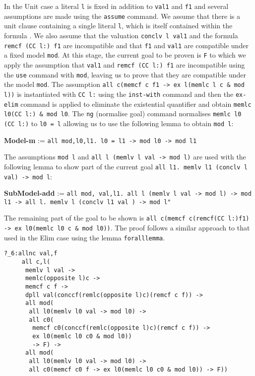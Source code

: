 In the Unit case a literal \texttt{l} is fixed in addition to \texttt{val1} and \texttt{f1} and several assumptions are made using the \texttt{assume} command.  We assume that there is a unit clause containing a single literal \texttt{l}, which is itself contained within the formula . We also assume that the valuation \texttt{conclv l val1} and the formula \texttt{remcf (CC l:) f1} are incompatible and that \texttt{f1} and \texttt{val1} are compatible under a fixed model \texttt{mod}. At this stage, the current goal to be proven is \texttt{F} to which we apply the assumption that \texttt{val1} and \texttt{remcf (CC l:) f1} are incompatible using the \texttt{use} command with \texttt{mod}, leaving us to prove that they are compatible under the model \texttt{mod}. The assumption  \texttt{all c(memcf c f1 -> ex l(memlc l c \& mod l))} is instantiated with \texttt{CC l:} using the \texttt{inst-with} command and then the \texttt{ex-elim} command is applied to eliminate the existential quantifier and obtain \texttt{memlc l0(CC l:) \& mod l0}. The \texttt{ng} (normalise goal) command normalises \texttt{memlc l0 (CC l:)} to \texttt{l0 = l} allowing us to use the following lemma to obtain \texttt{mod l}:

\begin{center}
\textbf{Model-m} := \texttt{all mod,l0,l1. l0 = l1 -> mod l0 -> mod l1} \\
\end{center}

The assumptions \texttt{mod l} and \texttt{all l (memlv l val -> mod l)}  are used with the following lemma to show part of the current goal \texttt{all l1. memlv l1 (conclv l val) -> mod l}:
\begin{center}
\textbf{SubModel-add} := \texttt{all mod, val,l1. all l (memlv l val  -> mod l) -> mod l1 -> all l. memlv l (conclv l1 val ) -> mod l"} \\
\end{center}

The remaining part of the goal to be shown is \texttt{\justify all c(memcf c(remcf(CC l:)f1) -> ex l0(memlc l0 c \& mod l0))}. The proof follows a similar approach to that used in the Elim case using the lemma \texttt{foralllemma}.

\begin{lstlisting}[caption = "The Reduce Case in Minlog"]
?_6:allnc val,f
     all c,l(
      memlv l val ->
      memlc(opposite l)c ->
      memcf c f ->
      dpll val(conccf(remlc(opposite l)c)(remcf c f)) ->
      all mod(
       all l0(memlv l0 val -> mod l0) ->
       all c0(
        memcf c0(conccf(remlc(opposite l)c)(remcf c f)) ->
        ex l0(memlc l0 c0 & mod l0)) 
        -> F) ->
      all mod(
       all l0(memlv l0 val -> mod l0) ->
       all c0(memcf c0 f -> ex l0(memlc l0 c0 & mod l0)) -> F))
\end{lstlisting}


